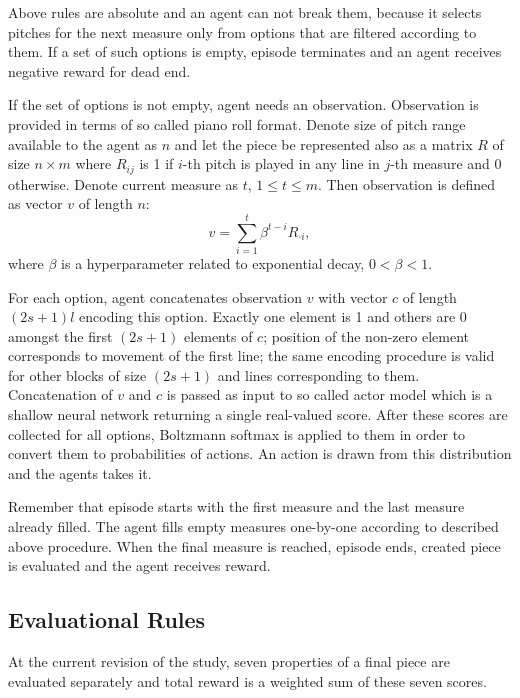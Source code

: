 \documentclass{article}
\begin{document}
Above rules are absolute and an agent can not break them, because it selects pitches for the next measure only from options that are filtered according to them. If a set of such options is empty, episode terminates and an agent receives negative reward for dead end.

If the set of options is not empty, agent needs an observation. Observation is provided in terms of so called piano roll format. Denote size of pitch range available to the agent as $n$ and let the piece be represented also as a matrix $R$ of size $n \times m$ where $R_{ij}$ is 1 if $i$-th pitch is played in any line in $j$-th measure and 0 otherwise. Denote current measure as $t$, $1 \le t \le m$. Then observation is defined as vector $v$ of length $n$:
$$v = \sum_{i = 1}^t \beta^{t - i} R_{\cdot i},$$
where $\beta$ is a hyperparameter related to exponential decay, $0 < \beta < 1$.

For each option, agent concatenates observation $v$ with vector $c$ of length $(2s + 1)l$ encoding this option. Exactly one element is 1 and others are 0 amongst the first $(2s + 1)$ elements of $c$; position of the non-zero element corresponds to movement of the first line; the same encoding procedure is valid for other blocks of size $(2s + 1)$ and lines corresponding to them. Concatenation of $v$ and $c$ is passed as input to so called actor model which is a shallow neural network returning a single real-valued score. After these scores are collected for all options, Boltzmann softmax is applied to them in order to convert them to probabilities of actions. An action is drawn from this distribution and the agents takes it.

Remember that episode starts with the first measure and the last measure already filled. The agent fills empty measures one-by-one according to described above procedure. When the final measure is reached, episode ends, created piece is evaluated and the agent receives reward.

\subsection{Evaluational Rules}
\label{subsec:setup}

At the current revision of the study, seven properties of a final piece are evaluated separately and total reward is a weighted sum of these seven scores.
\end{document}

